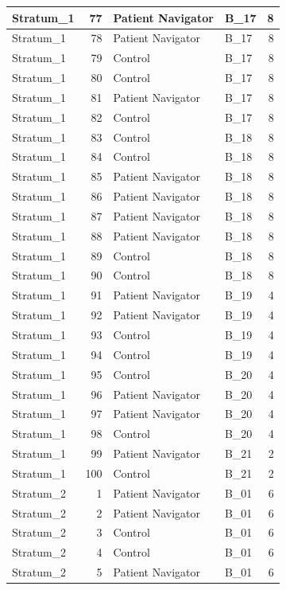 \documentclass[
]{book}
\begin{document}
\begin{table}[H]
\begin{tabular}{l|r|l|l|r}
\hline
Stratum\_1 & 77 & Patient Navigator & B\_17 & 8\\
\hline
Stratum\_1 & 78 & Patient Navigator & B\_17 & 8\\
\hline
Stratum\_1 & 79 & Control & B\_17 & 8\\
\hline
Stratum\_1 & 80 & Control & B\_17 & 8\\
\hline
Stratum\_1 & 81 & Patient Navigator & B\_17 & 8\\
\hline
Stratum\_1 & 82 & Control & B\_17 & 8\\
\hline
Stratum\_1 & 83 & Control & B\_18 & 8\\
\hline
Stratum\_1 & 84 & Control & B\_18 & 8\\
\hline
Stratum\_1 & 85 & Patient Navigator & B\_18 & 8\\
\hline
Stratum\_1 & 86 & Patient Navigator & B\_18 & 8\\
\hline
Stratum\_1 & 87 & Patient Navigator & B\_18 & 8\\
\hline
Stratum\_1 & 88 & Patient Navigator & B\_18 & 8\\
\hline
Stratum\_1 & 89 & Control & B\_18 & 8\\
\hline
Stratum\_1 & 90 & Control & B\_18 & 8\\
\hline
Stratum\_1 & 91 & Patient Navigator & B\_19 & 4\\
\hline
Stratum\_1 & 92 & Patient Navigator & B\_19 & 4\\
\hline
Stratum\_1 & 93 & Control & B\_19 & 4\\
\hline
Stratum\_1 & 94 & Control & B\_19 & 4\\
\hline
Stratum\_1 & 95 & Control & B\_20 & 4\\
\hline
Stratum\_1 & 96 & Patient Navigator & B\_20 & 4\\
\hline
Stratum\_1 & 97 & Patient Navigator & B\_20 & 4\\
\hline
Stratum\_1 & 98 & Control & B\_20 & 4\\
\hline
Stratum\_1 & 99 & Patient Navigator & B\_21 & 2\\
\hline
Stratum\_1 & 100 & Control & B\_21 & 2\\
\hline
Stratum\_2 & 1 & Patient Navigator & B\_01 & 6\\
\hline
Stratum\_2 & 2 & Patient Navigator & B\_01 & 6\\
\hline
Stratum\_2 & 3 & Control & B\_01 & 6\\
\hline
Stratum\_2 & 4 & Control & B\_01 & 6\\
\hline
Stratum\_2 & 5 & Patient Navigator & B\_01 & 6\\

\end{tabular}
\end{table}
\end{document}
